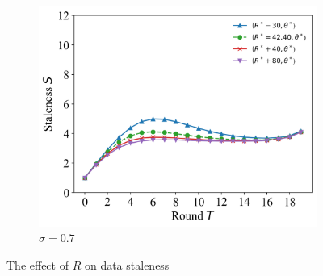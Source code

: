 \documentclass{article}
\theoremstyle{plain}
\theoremstyle{definition}
\theoremstyle{remark}
\begin{document}
\begin{figure}
\begin{subfigure}{0.31\textwidth}
		\centering
		\includegraphics[width=\textwidth]{figures/figure_73_C.png}
    \caption{$\sigma=0.7$}
	\end{subfigure}
	\caption{The effect of $R$ on data staleness}
\end{figure}
\end{document}
